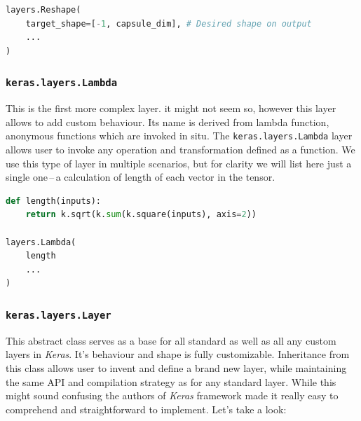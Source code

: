\begin{lstlisting}[language=Python, caption=Reshape layer]
layers.Reshape(
    target_shape=[-1, capsule_dim], # Desired shape on output
    ...
)
\end{lstlisting}

\subsubsection{\texttt{keras.layers.Lambda}}

This is the first more complex layer. it might not seem so, however this layer allows to add custom behaviour. Its name is derived from lambda function, anonymous functions which are invoked in situ. The \texttt{keras.layers.Lambda} layer allows user to invoke any operation and transformation defined as a function. We use this type of layer in multiple scenarios, but for clarity we will list here just a single one\,--\,a calculation of length of each vector in the tensor.

\begin{lstlisting}[language=Python, caption=Lambda layer]
def length(inputs):
    return k.sqrt(k.sum(k.square(inputs), axis=2))

layers.Lambda(
    length
    ...
)
\end{lstlisting}


\subsubsection{\texttt{keras.layers.Layer}}

This abstract class serves as a base for all standard as well as all any custom layers in \textit{Keras}. It's behaviour and shape is fully customizable. Inheritance from this class allows user to invent and define a brand new layer, while maintaining the same API and compilation strategy as for any standard layer. While this might sound confusing the authors of \textit{Keras} framework made it really easy to comprehend and straightforward to implement. Let's take a look:


